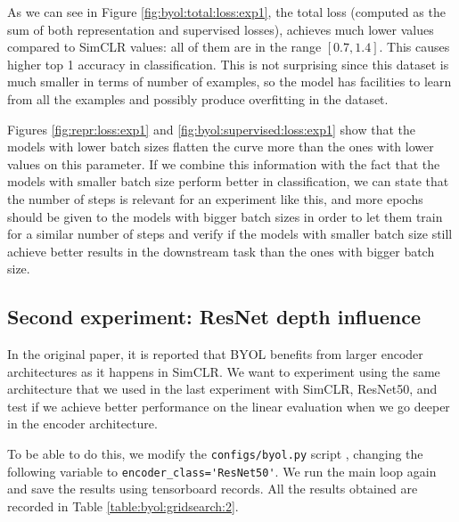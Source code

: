As we can see in Figure \ref{fig:byol:total:loss:exp1}, the total loss (computed as the sum of both representation and supervised losses), achieves much lower values compared to SimCLR values: all of them are in the range $[0.7,1.4]$. This causes higher top 1 accuracy in classification. This is not surprising since this dataset is much smaller in terms of number of examples, so the model has facilities to learn from all the examples and possibly produce overfitting in the dataset.

Figures \ref{fig:repr:loss:exp1} and \ref{fig:byol:supervised:loss:exp1} show that the models with lower batch sizes flatten the curve more than the ones with lower values on this parameter. If we combine this information with the fact that the models with smaller batch size perform better in classification, we can state that the number of steps is relevant for an experiment like this, and more epochs should be given to the models with bigger batch sizes in order to let them train for a similar number of steps and verify if the models with smaller batch size still achieve better results in the downstream task than the ones with bigger batch size.


\subsection{Second experiment: ResNet depth influence}
\label{byol:second:experiment}

In the original paper, it is reported that BYOL benefits from larger encoder architectures as it happens in SimCLR. We want to experiment using the same architecture that we used in the last experiment with SimCLR, ResNet50, and test if we achieve better performance on the linear evaluation when we go deeper in the encoder architecture.

To be able to do this, we modify the \lstinline{configs/byol.py} script , changing the following variable to \lstinline{encoder_class='ResNet50'}. We run the main loop again and save the results using tensorboard records. All the results obtained are recorded in Table \ref{table:byol:gridsearch:2}.


